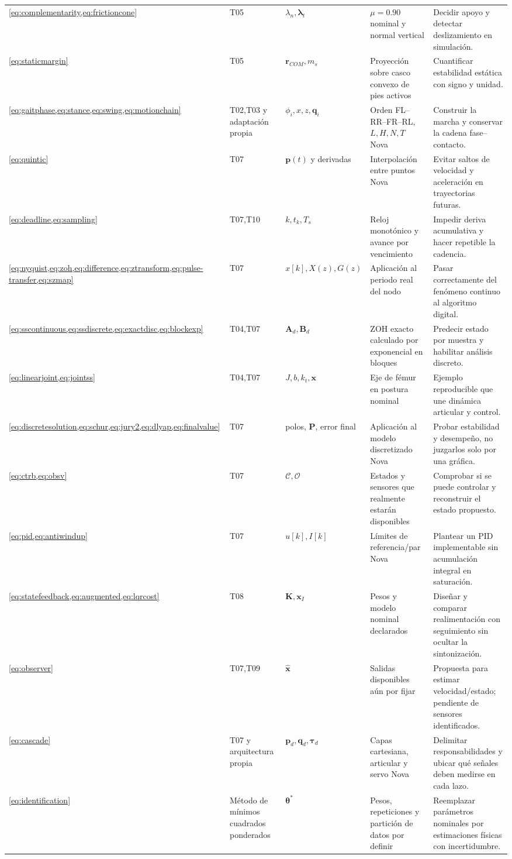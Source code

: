 \documentclass[11pt,letterpaper]{article}
\newcommand{\vect}[1]{\bm{#1}}
\newcommand{\mat}[1]{\bm{#1}}
\begin{document}
\begin{longtable}{p{2.5cm}p{2.1cm}p{3.1cm}p{3.5cm}p{3.3cm}}
\cref{eq:complementarity,eq:frictioncone}&T05&$\lambda_n,\vect\lambda_t$&
$\mu=0.90$ nominal y normal vertical&Decidir apoyo y detectar deslizamiento en
simulación.\\
\cref{eq:staticmargin}&T05&$\vect r_{COM},m_s$&Proyección sobre casco convexo
de pies activos&Cuantificar estabilidad estática con signo y unidad.\\
\cref{eq:gaitphase,eq:stance,eq:swing,eq:motionchain}&T02,T03 y adaptación
propia&$\phi_i,x,z,\vect q_i$&Orden FL--RR--FR--RL, $L,H,N,T$ Nova&Construir
la marcha y conservar la cadena fase--contacto.\\
\cref{eq:quintic}&T07&$\vect p(t)$ y derivadas&Interpolación entre puntos Nova&
Evitar saltos de velocidad y aceleración en trayectorias futuras.\\
\cref{eq:deadline,eq:sampling}&T07,T10&$k,t_k,T_s$&Reloj monotónico y avance
por vencimiento&Impedir deriva acumulativa y hacer repetible la cadencia.\\
\cref{eq:nyquist,eq:zoh,eq:difference,eq:ztransform,eq:pulse-transfer,eq:szmap}&
T07&$x[k],X(z),G(z)$&Aplicación al periodo real del nodo&Pasar correctamente
del fenómeno continuo al algoritmo digital.\\
\cref{eq:sscontinuous,eq:ssdiscrete,eq:exactdisc,eq:blockexp}&T04,T07&
$\mat A_d,\mat B_d$&ZOH exacto calculado por exponencial en bloques&Predecir
estado por muestra y habilitar análisis discreto.\\
\cref{eq:linearjoint,eq:jointss}&T04,T07&$J,b,k_t,\vect x$&Eje de fémur en
postura nominal&Ejemplo reproducible que une dinámica articular y control.\\
\cref{eq:discretesolution,eq:schur,eq:jury2,eq:dlyap,eq:finalvalue}&T07&
polos, $\mat P$, error final&Aplicación al modelo discretizado Nova&Probar
estabilidad y desempeño, no juzgarlos solo por una gráfica.\\
\cref{eq:ctrb,eq:obsv}&T07&$\mathcal C,\mathcal O$&Estados y sensores que
realmente estarán disponibles&Comprobar si se puede controlar y reconstruir el
estado propuesto.\\
\cref{eq:pid,eq:antiwindup}&T07&$u[k],I[k]$&Límites de referencia/par Nova&
Plantear un PID implementable sin acumulación integral en saturación.\\
\cref{eq:statefeedback,eq:augmented,eq:lqrcost}&T08&$\mat K,\vect x_I$&Pesos
y modelo nominal declarados&Diseñar y comparar realimentación con seguimiento
sin ocultar la sintonización.\\
\cref{eq:observer}&T07,T09&$\hat{\vect x}$&Salidas disponibles aún por fijar&
Propuesta para estimar velocidad/estado; pendiente de sensores identificados.\\
\cref{eq:cascade}&T07 y arquitectura propia&$\vect p_d,\vect q_d,\vect\tau_d$&
Capas cartesiana, articular y servo Nova&Delimitar responsabilidades y ubicar
qué señales deben medirse en cada lazo.\\
\cref{eq:identification}&Método de mínimos cuadrados ponderados&$\vect\theta^*$&
Pesos, repeticiones y partición de datos por definir&Reemplazar parámetros
nominales por estimaciones físicas con incertidumbre.\\
\bottomrule
\end{longtable}
\end{document}
